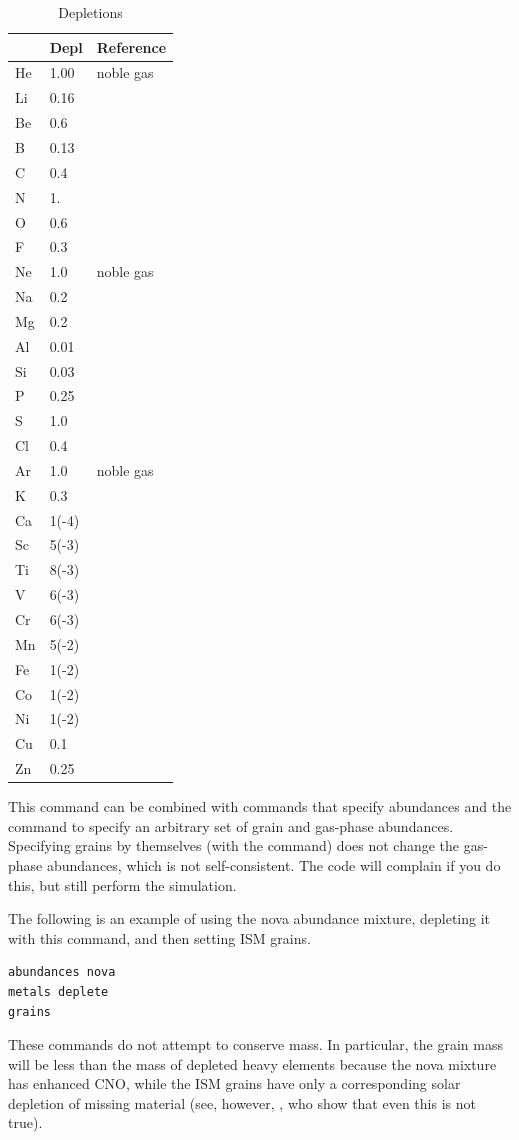 \begin{table}
\centering
\caption{Depletions}
\label{tab:GrainGasDepletionFactors}
\begin{tabular}{lll}\hline
&Depl& Reference\\
\hline
He& 1.00& noble gas\\
Li& 0.16& \citealp{White1986}\\
Be& 0.6& \citealp{York1982}\\
B& 0.13& \citealp{Federman1993}\\
C& 0.4\\
N& 1.\\
O& 0.6\\
F& 0.3& \citealp{Snow1981}\\
Ne& 1.0& noble gas\\
Na& 0.2\\
Mg& 0.2\\
Al& 0.01\\
Si& 0.03\\
P& 0.25& \citealp{Cardelli1991}\\
S& 1.0\\
Cl& 0.4\\
Ar&1.0& noble gas\\
K& 0.3& \citealp{Chaffee1982}\\
Ca& 1(-4)\\
Sc& 5(-3)& \citealp{Snow1980}\\
Ti& 8(-3)& \citealp{Crinklaw1994}\\
V& 6(-3)& \citealp{Cardelli1994}\\
Cr& 6(-3)& \citealp{Cardelli1991}\\
Mn& 5(-2)& \citealp{Cardelli1991}\\
Fe& 1(-2)\\
Co& 1(-2)\\
Ni& 1(-2)\\
Cu& 0.1& \citealp{Cardelli1991}\\
Zn& 0.25& \citealp{Cardelli1991}\\
\hline
\end{tabular}
\end{table}

This command can be combined with commands that specify abundances
and the  command to specify an arbitrary set of
grain and gas-phase abundances.
Specifying grains by themselves (with the  command)
does not change the gas-phase abundances,
which is not self-consistent.  The
code will complain if you do this, but still perform the simulation.

The following is an example of using
the nova abundance mixture, depleting it with this command,
and then setting ISM grains.
\begin{verbatim}
abundances nova
metals deplete
grains
\end{verbatim}
These commands do not attempt to conserve mass.
In particular, the grain
mass will be less than the mass of depleted heavy elements
because the nova
mixture has enhanced CNO, while the ISM grains have only
a corresponding
solar depletion of missing material
(see, however, \citealp{Snow1996}, who
show that even this is not true).








